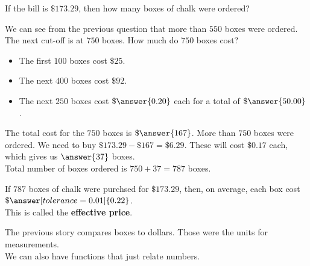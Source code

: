 \documentclass{ximera}
\begin{document}
\begin{question}
If the bill is $\$173.29$, then how many boxes of chalk were ordered?

\begin{explanation}

We can see from the previous question that more than $550$ boxes were ordered.  The next cut-off is at $750$ boxes.  How much do $750$ boxes cost? \\

\begin{itemize}
\item The first $100$ boxes cost $\$25$.
\item The next $400$ boxes cost $\$92$.
\item The next $250$ boxes cost $\$\answer{0.20}$ each for a total of $\$\answer{50.00}$.
\end{itemize}
The total cost for the $750$ boxes is $\$\answer{167}$. More than $750$ boxes were ordered.  We need to buy $\$173.29 - \$167 = \$6.29$.  These will cost $\$0.17$ each, which gives us $\answer{37}$ boxes.  \\


Total number of boxes ordered is $750 + 37 = 787$ boxes.


\end{explanation}
\end{question}



\begin{question}
If $787$ boxes of chalk were purchsed for $\$173.29$, then, on average, each box cost $\$\answer[tolerance=0.01]{0.22}$. \\

This is called the \textbf{effective price}.
\end{question}



The previous story compares boxes to dollars.  Those were the units for measurements. \\



We can also have functions that just relate numbers. \\
\end{document}
